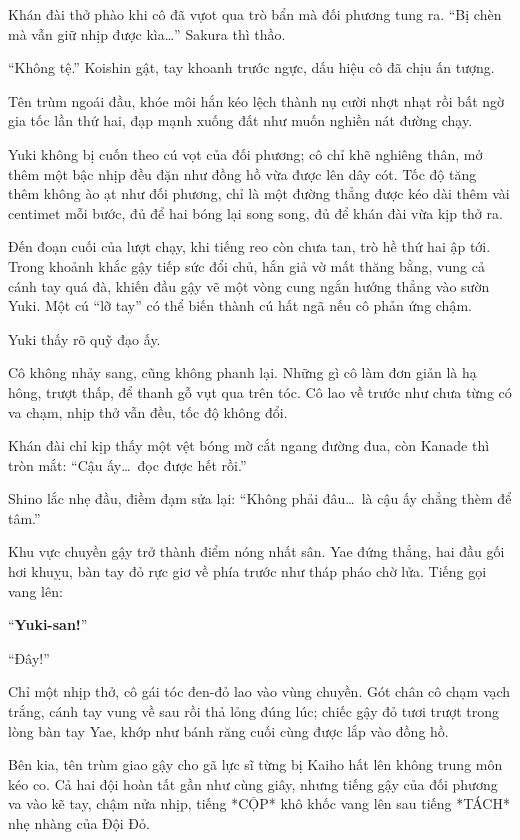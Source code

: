 \documentclass[../main.tex]{subfiles}
\begin{document}
Khán đài thở phào khi cô đã vựot qua trò bẩn mà đối phương tung ra.
``Bị chèn mà vẫn giữ nhịp được kìa\dots'' Sakura thì thầo.

``Không tệ.'' Koishin gật, tay khoanh trước ngực, dấu hiệu cô đã chịu ấn tượng.

Tên trùm ngoái đầu, khóe môi hắn kéo lệch thành nụ cười nhợt nhạt rồi bất ngờ gia tốc lần thứ hai, đạp mạnh xuống đất như muốn nghiền nát đường chạy.

Yuki không bị cuốn theo cú vọt của đối phương; cô chỉ khẽ nghiêng thân, mở thêm một bậc nhịp đều đặn như đồng hồ vừa được lên dây cót. Tốc độ tăng thêm không ào ạt như đối phương, chỉ là một đường thẳng được kéo dài thêm vài centimet mỗi bước, đủ để hai bóng lại song song, đủ để khán đài vừa kịp thở ra.

Đến đoạn cuối của lượt chạy, khi tiếng reo còn chưa tan, trò hề thứ hai ập tới.   Trong khoảnh khắc gậy tiếp sức đổi chủ, hắn giả vờ mất thăng bằng, vung cả cánh tay quá đà, khiến đầu gậy vẽ một vòng cung ngắn hướng thẳng vào sườn Yuki. Một cú ``lỡ tay'' có thể biến thành cú hất ngã nếu cô phản ứng chậm.

Yuki thấy rõ quỹ đạo ấy.

Cô không nhảy sang, cũng không phanh lại. Những gì cô làm đơn giản là hạ hông, trượt thấp, để thanh gỗ vụt qua trên tóc. Cô lao về trước như chưa từng có va chạm, nhịp thở vẫn đều, tốc độ không đổi.

Khán đài chỉ kịp thấy một vệt bóng mờ cắt ngang đường đua, còn Kanade thì tròn mắt:  ``Cậu ấy\dots\ đọc được hết rồi.''

Shino lắc nhẹ đầu, điềm đạm sửa lại: ``Không phải đâu\dots\ là cậu ấy chẳng thèm để tâm.''

Khu vực chuyền gậy trở thành điểm nóng nhất sân. Yae đứng thẳng, hai đầu gối hơi khuỵu, bàn tay đỏ rực giơ về phía trước như tháp pháo chờ lửa. Tiếng gọi vang lên:

``\textbf{Yuki-san!}''

``Đây!''

Chỉ một nhịp thở, cô gái tóc đen-đỏ lao vào vùng chuyền. Gót chân cô chạm vạch trắng, cánh tay vung về sau rồi thả lỏng đúng lúc; chiếc gậy đỏ tươi trượt trong lòng bàn tay Yae, khớp như bánh răng cuối cùng được lắp vào đồng hồ.

Bên kia, tên trùm giao gậy cho gã lực sĩ từng bị Kaiho hất lên không trung môn kéo co. Cả hai đội hoàn tất gần như cùng giây, nhưng tiếng gậy của đối phương va vào kẽ tay, chậm nửa nhịp, tiếng *CỘP* khô khốc vang lên sau tiếng *TÁCH* nhẹ nhàng của Đội Đỏ.
\end{document}
